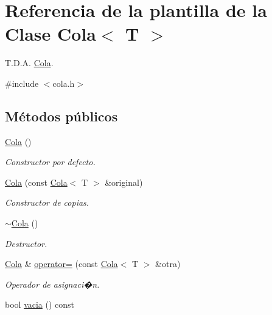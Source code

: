 \hypertarget{classCola}{}\section{Referencia de la plantilla de la Clase Cola$<$ T $>$}
\label{classCola}


T.\+D.\+A. \hyperlink{classCola}{Cola}.  




{\ttfamily \#include $<$cola.\+h$>$}

\subsection*{Métodos públicos}
\begin{DoxyCompactItemize}
\item 
\mbox{\label{classCola_aea3a971c7c522618f4dc972e8b4ff153}} 
\hyperlink{classCola_aea3a971c7c522618f4dc972e8b4ff153}{Cola} ()
\begin{DoxyCompactList}\small\item\em Constructor por defecto. \end{DoxyCompactList}\item 
\hyperlink{classCola_a2249ab5603a92fddb8bd9bb55abeaa24}{Cola} (const \hyperlink{classCola}{Cola}$<$ T $>$ \&original)
\begin{DoxyCompactList}\small\item\em Constructor de copias. \end{DoxyCompactList}\item 
\mbox{\label{classCola_af4d55930921c93c626006ba2e842530b}} 
\hyperlink{classCola_af4d55930921c93c626006ba2e842530b}{$\sim$\+Cola} ()
\begin{DoxyCompactList}\small\item\em Destructor. \end{DoxyCompactList}\item 
\hyperlink{classCola}{Cola} \& \hyperlink{classCola_a2ac480681dec95b8ffeea075507849e2}{operator=} (const \hyperlink{classCola}{Cola}$<$ T $>$ \&otra)
\begin{DoxyCompactList}\small\item\em Operador de asignaci�n. \end{DoxyCompactList}\item 
\mbox{\label{classCola_a2c746a66289cd4f90d4e43f712b72fb6}} 
bool \hyperlink{classCola_a2c746a66289cd4f90d4e43f712b72fb6}{vacia} () const

\end{DoxyCompactItemize}
